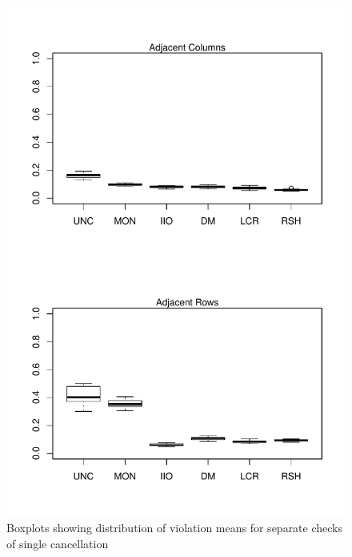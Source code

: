 \documentclass[12pt]{article}
\begin{document}
\begin{figure}
\centering
\caption{Boxplots showing distribution of violation means for  separate checks of single cancellation} \label{boxplots_single}
\includegraphics[height=\textheight]{./figs/boxplots_single}
\end{figure}
\end{document}
